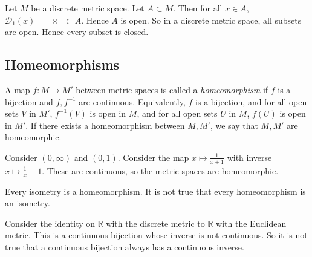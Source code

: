 \begin{example}
	Let \( M \) be a discrete metric space.
	Let \( A \subset M \).
	Then for all \( x \in A \), \( \mathcal D_1(x) = \qty{x} \subset A \).
	Hence \( A \) is open.
	So in a discrete metric space, all subsets are open.
	Hence every subset is closed.
\end{example}

\subsection{Homeomorphisms}
\begin{definition}
	A map \( f \colon M \to M' \) between metric spaces is called a \textit{homeomorphism} if \( f \) is a bijection and \( f, f^{-1} \) are continuous.
	Equivalently, \( f \) is a bijection, and for all open sets \( V \) in \( M' \), \( f^{-1}(V) \) is open in \( M \), and for all open sets \( U \) in \( M \), \( f(U) \) is open in \( M' \).
	If there exists a homeomorphism between \( M, M' \), we say that \( M, M' \) are homeomorphic.
\end{definition}
\begin{example}
	Consider \( (0,\infty) \) and \( (0,1) \).
	Consider the map \( x \mapsto \frac{1}{x+1} \) with inverse \( x \mapsto \frac{1}{x} - 1 \).
	These are continuous, so the metric spaces are homeomorphic.
\end{example}
\begin{remark}
	Every isometry is a homeomorphism.
	It is not true that every homeomorphism is an isometry.

	Consider the identity on \( \mathbb R \) with the discrete metric to \( \mathbb R \) with the Euclidean metric.
	This is a continuous bijection whose inverse is not continuous.
	So it is not true that a continuous bijection always has a continuous inverse.
\end{remark}


